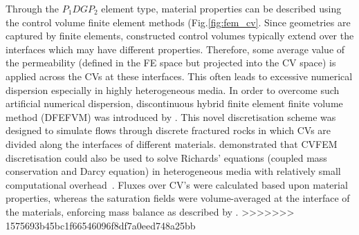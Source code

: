 \documentclass[preprint,authoryear,12pt]{elsarticle}
\newcommand{\KCnote}[1]{\fbox{\parbox{\textwidth}{ \color{black} KC Note $\Rightarrow$ #1}}}
\begin{document}
Through the $P_{1}DGP_{2}$ element type, material properties can be described using the control volume finite element methods (Fig.\ref{fig:fem_cv}. %
Since geometries are captured by finite elements, constructed control volumes typically extend over the interfaces which may have different properties. Therefore, some average value of the permeability (defined in the FE space but projected into the CV space) is applied across the CVs at these interfaces. This often leads to excessive numerical dispersion especially in highly heterogeneous media. In order to overcome such artificial numerical dispersion, discontinuous hybrid finite element finite volume method (DFEFVM) was introduced by \citet{nick_2011b, nick_2011a}. This novel discretisation scheme was designed to simulate flows through discrete fractured rocks in which CVs are divided along the interfaces of different materials. \citet{cumming_2011} demonstrated that CVFEM discretisation could also be used to solve Richards' equations (coupled mass conservation and Darcy equation) in heterogeneous media with relatively small computational overhead~\citep[compared with traditional coupled velocity-pressure based formulations, see also][]{cumming_phd2012}. Fluxes over CV's were calculated based upon material properties, whereas the saturation fields were volume-averaged at the interface of the materials, enforcing mass balance as described by \citet{kirkland_1992}.
>>>>>>> 1575693b45bc1f66546096f8df7a0eed748a25bb

\end{document}
